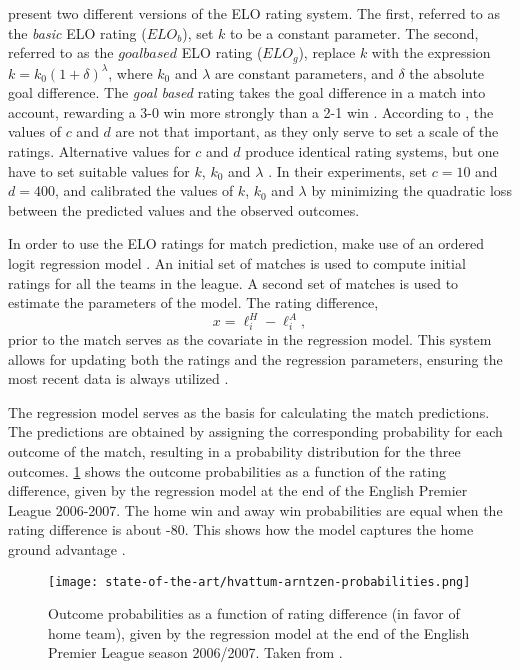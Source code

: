 \citet{bib:hvattum-arntzen-2010} present two different versions of the ELO rating system. The first, referred to as the \textit{basic} ELO rating ($ELO_{b}$), set $k$ to be a constant parameter. The second, referred to as the $goal based$ ELO rating ($ELO_{g}$), replace $k$ with the expression $k = k_{0}(1 + \delta)^{\lambda}$, where $k_ {0}$ and $\lambda$ are constant parameters, and $\delta$ the absolute goal difference. The \textit{goal based} rating takes the goal difference in a match into account, rewarding a 3-0 win more strongly than a 2-1 win \citep{bib:hvattum-arntzen-2010}. According to \citet{bib:hvattum-arntzen-2010}, the values of $c$ and $d$ are not that important, as they only serve to set a scale of the ratings. Alternative values for $c$ and $d$ produce identical rating systems, but one have to set suitable values for $k$, $k_{0}$ and $\lambda$ \citep{bib:hvattum-arntzen-2010}. In their experiments, \citet{bib:hvattum-arntzen-2010} set $c=10$ and $d=400$, and calibrated the values of $k$, $k_{0}$ and $\lambda$ by minimizing the quadratic loss between the predicted values and the observed outcomes.

In order to use the ELO ratings for match prediction, \citet{bib:hvattum-arntzen-2010} make use of an ordered logit regression model \citep{bib:williams2006generalized}. An initial set of matches is used to compute initial ratings for all the teams in the league. A second set of matches is used to estimate the parameters of the model. The rating difference,
\begin{equation*}
    x = \ell_{i}^{H} - \ell_{i}^{A},
\end{equation*}
prior to the match serves as the covariate in the regression model. This system allows for updating both the ratings and the regression parameters, ensuring the most recent data is always utilized \citep{bib:hvattum-arntzen-2010}. 

The regression model serves as the basis for calculating the match predictions. The predictions are obtained by assigning the corresponding probability for each outcome of the match, resulting in a probability distribution for the three outcomes. \cref{fig:hvattum-arntzen-probabilities} shows the outcome probabilities as a function of the rating difference, given by the regression model at the end of the English Premier League 2006-2007. The home win and away win probabilities are equal when the rating difference is about -80. This shows how the model captures the home ground advantage \citep{bib:hvattum-arntzen-2010}.
\begin{figure}
    \centering
    \texttt{[image: state-of-the-art/hvattum-arntzen-probabilities.png]}
    \caption{Outcome probabilities as a function of rating difference (in favor of home team), given by the regression model at the end of the English Premier League season 2006/2007. Taken from \citet{bib:hvattum-arntzen-2010}.}
    \label{fig:hvattum-arntzen-probabilities}
\end{figure}

